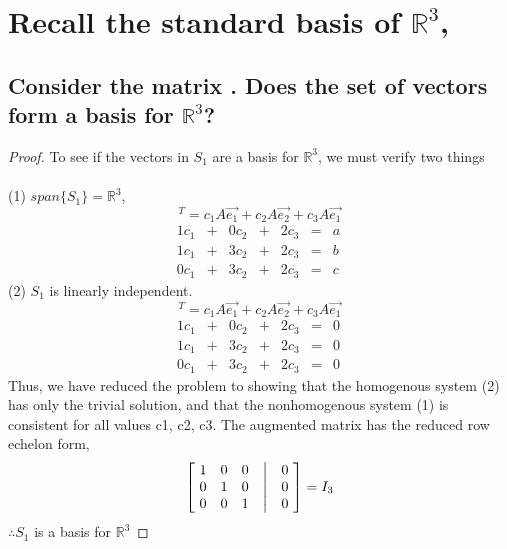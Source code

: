 \documentclass[../main.tex]{subfiles}
\begin{document}
\section{Recall the standard basis of
  $\mathbb{R}^3$, }
\subsection[Consider the matrix $A$ Does the set of vectors \DS{\{ A\vec{e_1},A\vec{e_2},A\vec{e_3} \}} form a basis for $\mathbb{R}^3$]
{Consider the matrix . Does the set of vectors  form a basis for $\mathbb{R}^3$?
}
\begin{proof}
  To see if the vectors in $S_{1}$ are a basis for $\mathbb{R}^3$, we must verify two things \\\\
  (1) $span\{S_{1}\} = \mathbb{R}^3$,
  \begin{equation*}
    [a\ b\ c]^{T} = c_{1}A\vec{e_1} + c_{2}A\vec{e_2} + c_{3}A\vec{e_1}
  \end{equation*}
  $$
    \begin{matrix}
      1c_{1} & + & 0c_{2} & + & 2c_{3} & = & a \ \\
      1c_{1} & + & 3c_{2} & + & 2c_{3} & = & b \ \\
      0c_{1} & + & 3c_{2} & + & 2c_{3} & = & c \
    \end{matrix}
  $$
  (2) $S_{1}$ is linearly independent.
  \begin{equation*}
    [0\ 0\ 0]^{T} = c_{1}A\vec{e_1} + c_{2}A\vec{e_2} + c_{3}A\vec{e_1}
  \end{equation*}
  $$
    \begin{matrix}
      1c_{1} & + & 0c_{2} & + & 2c_{3} & = & 0 \ \\
      1c_{1} & + & 3c_{2} & + & 2c_{3} & = & 0 \ \\
      0c_{1} & + & 3c_{2} & + & 2c_{3} & = & 0 \
    \end{matrix}
  $$
  Thus, we have reduced the problem to showing that the homogenous system (2) has only the trivial solution, and that the nonhomogenous system (1) is consistent for all values c1, c2, c3.
  The augmented matrix has the reduced row echelon form,
  \begin{align*}
    \begin{bmatrix}
      \ 1 & 0 & 0 & \bigm| & 0\ \\
      \ 0 & 1 & 0 & \bigm| & 0\ \\
      \ 0 & 0 & 1 & \bigm| & 0\
    \end{bmatrix} = I_{3}
  \end{align*}
  $\therefore {S_{1}}$ is a basis for $\mathbb{R}^3$
\end{proof}
\end{document}
